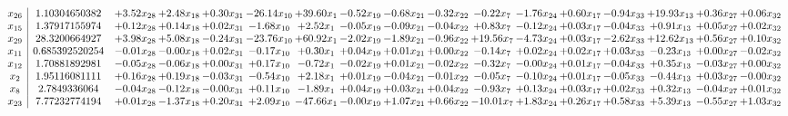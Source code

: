 \documentclass[9pt]{article}
\begin{document}
 \[\begin{array}{c| c c@{\hskip 2pt} c@{\hskip 2pt} c@{\hskip 2pt} c@{\hskip 2pt} c@{\hskip 2pt} c@{\hskip 2pt} c@{\hskip 2pt} c@{\hskip 2pt} c@{\hskip 2pt} c@{\hskip 2pt} c@{\hskip 2pt} c@{\hskip 2pt} c@{\hskip 2pt} c@{\hskip 2pt} c@{\hskip 2pt} }
 x_{26}   &  1.10304650382 & +  3.52 x_{28} & +  2.48 x_{18} & +  0.30 x_{31} & -26.14 x_{10} & + 39.60 x_{1} & -0.52 x_{19} & -0.68 x_{21} & -0.32 x_{22} & -0.22 x_{7} & -1.76 x_{24} & +  0.60 x_{17} & -0.94 x_{33} & + 19.93 x_{13} & +  0.36 x_{27} & +  0.06 x_{32}\\
 x_{15}   &  1.37917155974 & +  0.12 x_{28} & +  0.14 x_{18} & +  0.02 x_{31} & -1.68 x_{10} & +  2.52 x_{1} & -0.05 x_{19} & -0.09 x_{21} & -0.04 x_{22} & +  0.83 x_{7} & -0.12 x_{24} & +  0.03 x_{17} & -0.04 x_{33} & +  0.91 x_{13} & +  0.05 x_{27} & +  0.02 x_{32}\\
 x_{29}   &  28.3200664927 & +  3.98 x_{28} & +  5.08 x_{18} & -0.24 x_{31} & -23.76 x_{10} & + 60.92 x_{1} & -2.02 x_{19} & -1.89 x_{21} & -0.96 x_{22} & + 19.56 x_{7} & -4.73 x_{24} & +  0.03 x_{17} & -2.62 x_{33} & + 12.62 x_{13} & +  0.56 x_{27} & +  0.10 x_{32}\\
 x_{11}   &  0.685392520254 & -0.01 x_{28} & -0.00 x_{18} & +  0.02 x_{31} & -0.17 x_{10} & +  0.30 x_{1} & +  0.04 x_{19} & +  0.01 x_{21} & +  0.00 x_{22} & -0.14 x_{7} & +  0.02 x_{24} & +  0.02 x_{17} & +  0.03 x_{33} & -0.23 x_{13} & +  0.00 x_{27} & -0.02 x_{32}\\
 x_{12}   &  1.70881892981 & -0.05 x_{28} & -0.06 x_{18} & +  0.00 x_{31} & +  0.17 x_{10} & -0.72 x_{1} & -0.02 x_{19} & +  0.01 x_{21} & -0.02 x_{22} & -0.32 x_{7} & -0.00 x_{24} & +  0.01 x_{17} & -0.04 x_{33} & +  0.35 x_{13} & -0.03 x_{27} & +  0.00 x_{32}\\
 x_{2}   &  1.95116081111 & +  0.16 x_{28} & +  0.19 x_{18} & -0.03 x_{31} & -0.54 x_{10} & +  2.18 x_{1} & +  0.01 x_{19} & -0.04 x_{21} & -0.01 x_{22} & -0.05 x_{7} & -0.10 x_{24} & +  0.01 x_{17} & -0.05 x_{33} & -0.44 x_{13} & +  0.03 x_{27} & -0.00 x_{32}\\
 x_{8}   &  2.7849336064 & -0.04 x_{28} & -0.12 x_{18} & -0.00 x_{31} & +  0.11 x_{10} & -1.89 x_{1} & +  0.04 x_{19} & +  0.03 x_{21} & +  0.04 x_{22} & -0.93 x_{7} & +  0.13 x_{24} & +  0.03 x_{17} & +  0.02 x_{33} & +  0.32 x_{13} & -0.04 x_{27} & +  0.01 x_{32}\\
 x_{23}   &  7.77232774194 & +  0.01 x_{28} & -1.37 x_{18} & +  0.20 x_{31} & +  2.09 x_{10} & -47.66 x_{1} & -0.00 x_{19} & +  1.07 x_{21} & +  0.66 x_{22} & -10.01 x_{7} & +  1.83 x_{24} & +  0.26 x_{17} & +  0.58 x_{33} & +  5.39 x_{13} & -0.55 x_{27} & +  1.03 x_{32}\\

\end{array}\]
\end{document}

